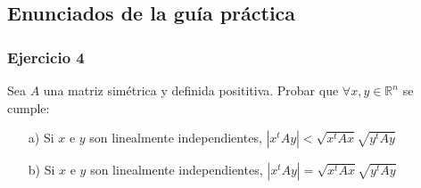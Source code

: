 \subsection{Enunciados de la guía práctica}\label{subsec:enunciados_guia_3_sdp}

\subsubsection{Ejercicio 4}\label{subsubsec:guia_3_ej_4}

Sea $A$ una matriz simétrica y definida posititiva. Probar que $\forall x, y \in \mathbb{R}^{n}$ se cumple:

\begin{itemize}
    \item[a)] Si $x$ e $y$ son linealmente independientes, $|x^{t}Ay| < \sqrt{x^{t}Ax}\sqrt{y^{t}Ay}$
    \item[b)] Si $x$ e $y$ son linealmente independientes, $|x^{t}Ay| = \sqrt{x^{t}Ax}\sqrt{y^{t}Ay}$
\end{itemize}
